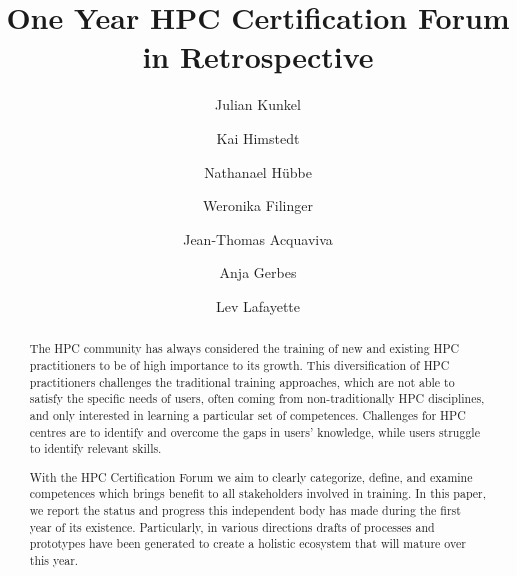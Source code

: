 \documentclass[jocse]{jocseart}
\begin{document}
\title{One Year HPC Certification Forum in Retrospective}

\author{Julian Kunkel}


\author{Kai Himstedt}
\author{Nathanael Hübbe}

\author{Weronika Filinger}

\author{Jean-Thomas Acquaviva}


\author{Anja Gerbes}

\author{Lev Lafayette}

\renewcommand{\shortauthors}{J. Kunkel et al.}


\begin{abstract}
  The HPC community has always considered the training of new and existing HPC practitioners to be of high importance to its growth.
  This diversification of HPC practitioners challenges the traditional training approaches, which are not able to satisfy the specific needs of users, often coming from non-traditionally HPC disciplines, and only interested in learning a particular set of competences.
  Challenges for HPC centres are to identify and overcome the gaps in users’ knowledge, while users struggle to identify relevant skills.

  With the HPC Certification Forum we aim to clearly categorize, define, and examine competences which brings benefit to all stakeholders involved in training.
  In this paper, we report the status and progress this independent body has made during the first year of its existence.
  Particularly, in various directions drafts of processes and prototypes have been generated to create a holistic ecosystem that will mature over this year.
\end{abstract}

%
%
\begin{CCSXML}
\end{CCSXML}
\end{document}
